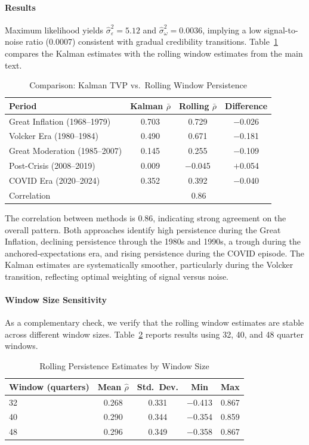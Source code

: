 \documentclass[10pt]{article}
\begin{document}
\paragraph{Results} Maximum likelihood yields $\hat{\sigma}^2_{\varepsilon} = 5.12$ and $\hat{\sigma}^2_{\omega} = 0.0036$, implying a low signal-to-noise ratio (0.0007) consistent with gradual credibility transitions. Table~\ref{tab:kalman_comparison} compares the Kalman estimates with the rolling window estimates from the main text.

\begin{table}[htbp]
\centering
\caption{Comparison: Kalman TVP vs.\ Rolling Window Persistence}
\label{tab:kalman_comparison}
\begin{tabular}{lccc}
\toprule
Period & Kalman $\bar{\rho}$ & Rolling $\bar{\rho}$ & Difference \\
\midrule
Great Inflation (1968--1979) & 0.703 & 0.729 & $-$0.026 \\
Volcker Era (1980--1984) & 0.490 & 0.671 & $-$0.181 \\
Great Moderation (1985--2007) & 0.145 & 0.255 & $-$0.109 \\
Post-Crisis (2008--2019) & 0.009 & $-$0.045 & $+$0.054 \\
COVID Era (2020--2024) & 0.352 & 0.392 & $-$0.040 \\
\midrule
Correlation & \multicolumn{3}{c}{0.86} \\
\bottomrule
\end{tabular}
\end{table}

The correlation between methods is 0.86, indicating strong agreement on the overall pattern. Both approaches identify high persistence during the Great Inflation, declining persistence through the 1980s and 1990s, a trough during the anchored-expectations era, and rising persistence during the COVID episode. The Kalman estimates are systematically smoother, particularly during the Volcker transition, reflecting optimal weighting of signal versus noise.

\paragraph{Window Size Sensitivity} As a complementary check, we verify that the rolling window estimates are stable across different window sizes. Table~\ref{tab:window_sensitivity} reports results using 32, 40, and 48 quarter windows.

\begin{table}[htbp]
\centering
\caption{Rolling Persistence Estimates by Window Size}
\label{tab:window_sensitivity}
\begin{tabular}{lcccc}
\toprule
Window (quarters) & Mean $\hat{\rho}$ & Std.\ Dev. & Min & Max \\
\midrule
32 & 0.268 & 0.331 & $-$0.413 & 0.867 \\
40 & 0.290 & 0.344 & $-$0.354 & 0.859 \\
48 & 0.296 & 0.349 & $-$0.358 & 0.867 \\
\bottomrule
\end{tabular}
\end{table}
\end{document}
